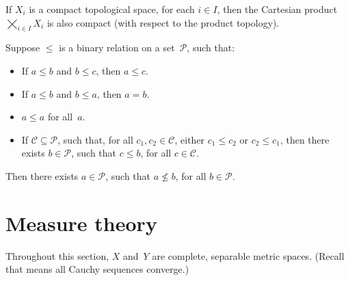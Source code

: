 \begin{thm} \label{TychonoffThm}
If $X_i$ is a compact topological space, for each $i \in I$, then the Cartesian product $\bigtimes_{i \in I} X_i$ is also compact\/ \textup(with respect to the product topology\/\textup).
\end{thm}

\begin{prop} \label{ZornsLemma}
Suppose $\le$ is a binary relation on a set~$\mathcal{P}$, such that:
	\begin{itemize}
	\item If $a \le b$ and $b \le c$, then $a \le c$.
	\item If $a \le b$ and $b \le a$, then $a = b$.
	\item $a \le a$ for all~$a$.
	\item If $\mathcal{C} \subseteq \mathcal{P}$, such that, for all $c_1,c_2 \in \mathcal{C}$, either $c_1 \le c_2$ or $c_2 \le c_1$, then there exists $b \in \mathcal{P}$, such that $c \le b$, for all $c \in \mathcal{C}$.
	\end{itemize}
Then there exists $a \in \mathcal{P}$, such that $a \not\le b$, for all $b \in \mathcal{P}$.
\end{prop}





\section{Measure theory} \label{MeasThySect}

\begin{assump}
Throughout this section, %
$X$ and~$Y$ are complete, separable metric spaces. (Recall that  means all Cauchy sequences converge.)
\end{assump}

